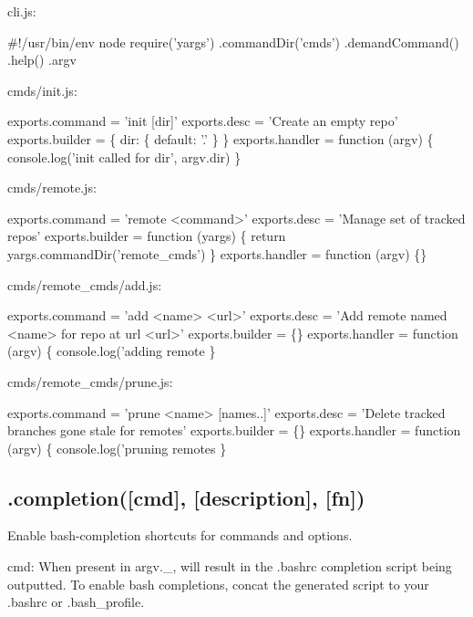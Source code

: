 cli.\+js\+:


\begin{DoxyCode}
#!/usr/bin/env node
require('yargs')
  .commandDir('cmds')
  .demandCommand()
  .help()
  .argv
\end{DoxyCode}


cmds/init.\+js\+:


\begin{DoxyCode}
exports.command = 'init [dir]'
exports.desc = 'Create an empty repo'
exports.builder = \{
  dir: \{
    default: '.'
  \}
\}
exports.handler = function (argv) \{
  console.log('init called for dir', argv.dir)
\}
\end{DoxyCode}


cmds/remote.\+js\+:


\begin{DoxyCode}
exports.command = 'remote <command>'
exports.desc = 'Manage set of tracked repos'
exports.builder = function (yargs) \{
  return yargs.commandDir('remote\_cmds')
\}
exports.handler = function (argv) \{\}
\end{DoxyCode}


cmds/remote\+\_\+cmds/add.\+js\+:


\begin{DoxyCode}
exports.command = 'add <name> <url>'
exports.desc = 'Add remote named <name> for repo at url <url>'
exports.builder = \{\}
exports.handler = function (argv) \{
  console.log('adding remote %
\}
\end{DoxyCode}


cmds/remote\+\_\+cmds/prune.\+js\+:


\begin{DoxyCode}
exports.command = 'prune <name> [names..]'
exports.desc = 'Delete tracked branches gone stale for remotes'
exports.builder = \{\}
exports.handler = function (argv) \{
  console.log('pruning remotes %
\}
\end{DoxyCode}


\subsection*{.completion(\mbox{[}cmd\mbox{]}, \mbox{[}description\mbox{]}, \mbox{[}fn\mbox{]}) }

Enable bash-\/completion shortcuts for commands and options.

{\ttfamily cmd}\+: When present in {\ttfamily argv.\+\_\+}, will result in the {\ttfamily .bashrc} completion script being outputted. To enable bash completions, concat the generated script to your {\ttfamily .bashrc} or {\ttfamily .bash\+\_\+profile}.

